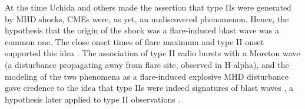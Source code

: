 At the time Uchida and others made the assertion that type IIs were generated by MHD shocks, CMEs were, as yet, an undiscovered phenomenon. Hence, the hypothesis that the origin of the shock was a flare-induced blast wave was a common one. The close onset times of flare maximum and type II onset supported this idea \citep{maxwell1962}. The association of type II radio bursts with a Moreton wave (a disturbance propagating away from flare site, observed in H-alpha), and the modeling of the two phenomena as a flare-induced explosive MHD disturbance gave credence to the idea that type IIs were indeed signatures of blast waves \citep{uchida1974}, a hypothesis later applied to type II observations \citep{kosugi1976}. 

